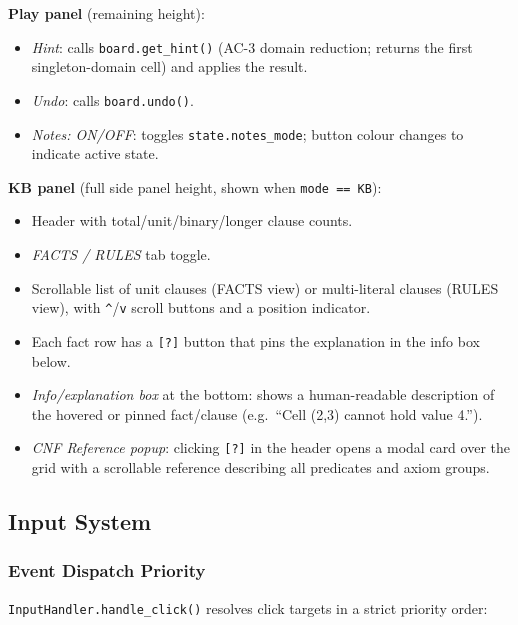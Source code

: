 \textbf{Play panel} (remaining height):
\begin{itemize}
  \item \emph{Hint}: calls \texttt{board.get\_hint()} (AC-3 domain reduction;
        returns the first singleton-domain cell) and applies the result.
  \item \emph{Undo}: calls \texttt{board.undo()}.
  \item \emph{Notes: ON/OFF}: toggles \texttt{state.notes\_mode}; button
        colour changes to indicate active state.
\end{itemize}

\textbf{KB panel} (full side panel height, shown when \texttt{mode == KB}):
\begin{itemize}
  \item Header with total/unit/binary/longer clause counts.
  \item \emph{FACTS / RULES} tab toggle.
  \item Scrollable list of unit clauses (FACTS view) or multi-literal clauses
        (RULES view), with \texttt{\^}/\texttt{v} scroll buttons and a
        position indicator.
  \item Each fact row has a \texttt{[?]} button that pins the explanation in
        the info box below.
  \item \emph{Info/explanation box} at the bottom: shows a human-readable
        description of the hovered or pinned fact/clause (e.g.\ ``Cell (2,3)
        cannot hold value 4.'').
  \item \emph{CNF Reference popup}: clicking \texttt{[?]} in the header opens
        a modal card over the grid with a scrollable reference describing all
        predicates and axiom groups.
\end{itemize}

\subsection{Input System}
\label{sec:ui_input}

\subsubsection{Event Dispatch Priority}

\texttt{InputHandler.handle\_click()} resolves click targets in a strict
priority order:

